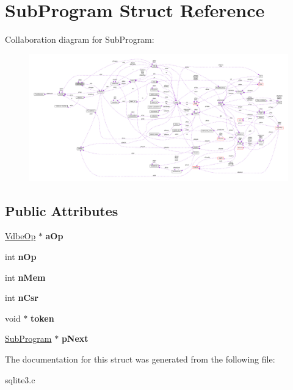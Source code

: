 \hypertarget{struct_sub_program}{\section{Sub\-Program Struct Reference}
\label{struct_sub_program}
}


Collaboration diagram for Sub\-Program\-:\nopagebreak
\begin{figure}[H]
\begin{center}
\leavevmode
\includegraphics[width=350pt]{struct_sub_program__coll__graph}
\end{center}
\end{figure}
\subsection*{Public Attributes}
\begin{DoxyCompactItemize}
\item 
\hypertarget{struct_sub_program_aa9bb1992fed633d182076a35d6448c7d}{\hyperlink{struct_vdbe_op}{Vdbe\-Op} $\ast$ {\bfseries a\-Op}}\label{struct_sub_program_aa9bb1992fed633d182076a35d6448c7d}

\item 
\hypertarget{struct_sub_program_a6fe204a75ab8254c453be77f024b6d69}{int {\bfseries n\-Op}}\label{struct_sub_program_a6fe204a75ab8254c453be77f024b6d69}

\item 
\hypertarget{struct_sub_program_a9bece42fdeb81085809d7c2f8aa05616}{int {\bfseries n\-Mem}}\label{struct_sub_program_a9bece42fdeb81085809d7c2f8aa05616}

\item 
\hypertarget{struct_sub_program_a83b18aa5cc63aecdbf996c16af1e48bb}{int {\bfseries n\-Csr}}\label{struct_sub_program_a83b18aa5cc63aecdbf996c16af1e48bb}

\item 
\hypertarget{struct_sub_program_aaea3b67899b092476b107d22a4e2022d}{void $\ast$ {\bfseries token}}\label{struct_sub_program_aaea3b67899b092476b107d22a4e2022d}

\item 
\hypertarget{struct_sub_program_a7da35488ac58a64fa30b88da56aac8b3}{\hyperlink{struct_sub_program}{Sub\-Program} $\ast$ {\bfseries p\-Next}}\label{struct_sub_program_a7da35488ac58a64fa30b88da56aac8b3}

\end{DoxyCompactItemize}


The documentation for this struct was generated from the following file\-:\begin{DoxyCompactItemize}
\item 
sqlite3.\-c\end{DoxyCompactItemize}
